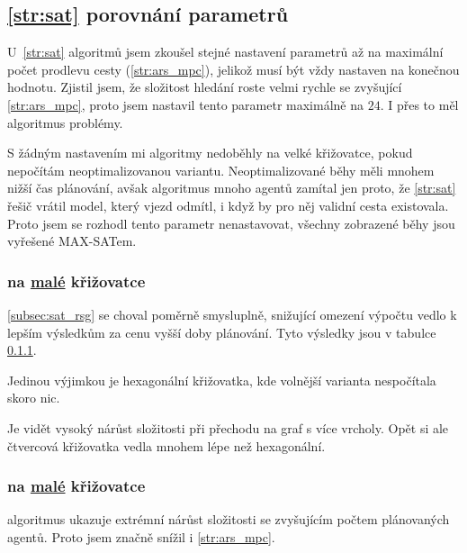 \subsection{\ref{str:sat} porovnání parametrů}\label{subsec:sat_porovnani_parametru}

U~\ref{str:sat} algoritmů jsem zkoušel stejné nastavení parametrů až na maximální počet prodlevu cesty (\ref{str:ars_mpc}),
jelikož musí být vždy nastaven na konečnou hodnotu.
Zjistil jsem, že složitost hledání roste velmi rychle se zvyšující \ref{str:ars_mpc},
proto jsem nastavil tento parametr maximálně na $24$.
I přes to měl algoritmus problémy.

S žádným nastavením mi algoritmy nedoběhly na velké křižovatce, pokud nepočítám neoptimalizovanou variantu.
Neoptimalizované běhy měli mnohem nižší čas plánování, avšak algoritmus mnoho agentů zamítal jen proto, že \ref{str:sat}
řešič vrátil model, který vjezd odmítl, i když by pro něj validní cesta existovala.
Proto jsem se rozhodl tento parametr nenastavovat, všechny zobrazené běhy jsou vyřešené \textrm{MAX-SAT}em.

\subsubsection{ na \hyperref[par:data_mala]{malé} křižovatce}
\label{subsubsec:exp_satsg_mala_krizovatka}



\ref{subsec:sat_rsg} se choval poměrně smysluplně, snižující omezení výpočtu vedlo k lepším výsledkům
za cenu vyšší doby plánování.
Tyto výsledky jsou v tabulce \ref{subsubsec:exp_satsg_mala_krizovatka}.

Jedinou výjimkou je hexagonální křižovatka, kde volnější varianta nespočítala skoro nic.

Je vidět vysoký nárůst složitosti při přechodu na graf s více vrcholy.
Opět si ale čtvercová křižovatka vedla mnohem lépe než hexagonální.

\subsubsection{ na \hyperref[par:data_mala]{malé} křižovatce}
\label{subsubsec:exp_sata_mala_krizovatka}

 algoritmus ukazuje extrémní nárůst složitosti se zvyšujícím počtem plánovaných agentů.
Proto jsem značně snížil i \ref{str:ars_mpc}.

